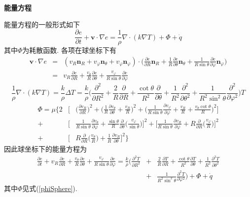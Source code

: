 \begin{solution}
\vspace{0.75em}
\noindent\textbf{能量方程}
\vspace{0.75em}

\noindent 能量方程的一般形式如下
\[
\frac{\partial e}{\partial t} +\mathbf{v}\cdot\nabla e = \frac{1}{\rho}\nabla\cdot(k\nabla T) + \Phi + \dot{q}
\]
其中$\Phi$为耗散函数. 各项在球坐标下有
{\setlength\arraycolsep{2pt}
\begin{eqnarray}
\mathbf{v}\cdot\nabla e & = & (v_R\mathbf{n}_R + v_\varphi\mathbf{n}_\theta + v_\varphi\mathbf{n}_\varphi)\cdot
\Big(\frac{\partial e}{\partial R}\mathbf{n}_R
+ \frac{1}{R}\frac{\partial e}{\partial\theta}\mathbf{n}_\theta
+ \frac{1}{R\sin\theta}\frac{\partial e}{\partial \varphi}\mathbf{n}_\varphi\Big)\nonumber\\
& = &
v_R\frac{\partial e}{\partial R} +
\frac{v_\theta }{R}\frac{\partial e}{\partial\theta}+
\frac{v_\varphi}{R\sin\theta}\frac{\partial e}{\partial \varphi}\nonumber
\end{eqnarray}}
\[
\frac{1}{\rho}\nabla\cdot(k\nabla T) = \frac{k}{\rho}\Delta T= \frac{k}{\rho}
\Big(
\frac{\partial^2}{\partial R^2} + \frac{2}{R}\frac{\partial}{\partial R}
+ \frac{\cot\theta}{R^2}\frac{\partial}{\partial\theta}+\frac{1}{R^2}\frac{\partial^2}{\partial\theta^2}
+\frac{1}{R^2\sin^2\theta}\frac{\partial^2}{\partial\varphi^2}
\Big)T
\]
{\setlength\arraycolsep{2pt}
\begin{eqnarray}\label{phiSphere}
\Phi  =  \mu
\Big\{
   2& \big[ &
        \big(\frac{\partial v_R}{\partial R}\big)^2
        +\big(\frac{1}{R}\frac{\partial v_\theta}{\partial\theta}+\frac{v_R}{R}\big)^2
        +\big(\frac{1}{R\sin\theta}\frac{\partial v_\varphi}{\partial\varphi}+\frac{v_R}{R}+\frac{v_\theta\cot\theta}{R}\big)^2
    \big]\nonumber\\
+ & \big[ &
        \frac{1}{R\sin\theta}\frac{\partial v_\theta}{\partial\varphi}
        +\frac{\sin\theta}{R}\frac{\partial}{\partial\theta}\big(\frac{v_\varphi}{\sin\theta}\big)
    \big]^2
+  \big[
         \frac{1}{R\sin\theta}\frac{\partial v_R}{\partial\varphi}
        +R\frac{\partial}{\partial R}\big(\frac{v_\varphi}{R}\big)
    \big]^2\nonumber\\
+ & \big[ &
        R\frac{\partial}{\partial R}\big(\frac{v_\theta}{R}\big)
        +\frac{1}{R}\frac{\partial v_R}{\partial\theta}
    \big]^2
\Big\}
\end{eqnarray}}
因此球坐标下的能量方程为
{\setlength\arraycolsep{2pt}
\begin{eqnarray}
\frac{\partial e}{\partial t}
+ v_R\frac{\partial e}{\partial R} +
\frac{v_\theta }{R}\frac{\partial e}{\partial\theta}+
\frac{v_\varphi}{R\sin\theta}\frac{\partial e}{\partial \varphi}
=
\frac{k}{\rho}
\Big(
\frac{\partial^2T}{\partial R^2} &+& \frac{2}{R}\frac{\partial T}{\partial R}
+ \frac{\cot\theta}{R^2}\frac{\partial T}{\partial\theta}+\frac{1}{R^2}\frac{\partial^2T}{\partial\theta^2}\nonumber\\
&+&\frac{1}{R^2\sin^2\theta}\frac{\partial^2T}{\partial\varphi^2}
\Big)
+\Phi
+\dot{q}
\end{eqnarray}}
其中$\Phi$见式(\ref{phiSphere}).
\end{solution} 
